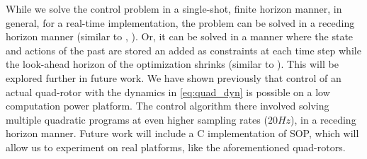 
While we solve the control problem in a single-shot, finite horizon manner, in general, for a real-time implementation, the problem can be solved in a receding horizon manner (similar to \cite{PantAMNDM15_Anytime}, \cite{Jain2016}). Or, it can be solved in a manner where the state and actions of the past are stored an added as constraints at each time step while the look-ahead horizon of the optimization shrinks (similar to \cite{Raman14_MPCSTL}). This will be explored further in future work. We have shown previously \cite{PantAMNDM15_Anytime} that control of an actual quad-rotor with the dynamics in \eqref{eq:quad_dyn} is possible on a low computation power platform. The control algorithm there involved solving multiple quadratic programs at even higher sampling rates ($20Hz$), in a receding horizon manner. Future work will include a C implementation of SOP, which will allow us to experiment on real platforms, like the aforementioned quad-rotors.
